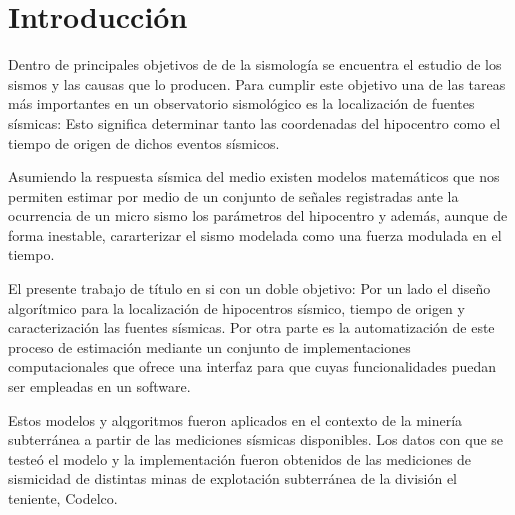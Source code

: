 


\chapter*{Introducción} 

Dentro de principales objetivos de de la sismología se encuentra el estudio
de los sismos y las causas que lo producen. Para cumplir este objetivo una de las
tareas más importantes en un observatorio sismológico es la localización de
fuentes sísmicas: Esto significa determinar tanto las coordenadas del hipocentro
como el tiempo de origen de dichos eventos sísmicos.

Asumiendo la respuesta sísmica del medio existen modelos matemáticos que nos
permiten estimar por medio de un conjunto de señales registradas ante la
ocurrencia de un micro sismo los parámetros del hipocentro y además, aunque de
forma inestable, cararterizar el sismo modelada como una fuerza modulada en el
tiempo. %

El presente trabajo de título en si con un doble objetivo: Por un lado el diseño
algorítmico para la localización de hipocentros sísmico, tiempo de origen y
caracterización las fuentes sísmicas. Por otra parte es la automatización de
este proceso de estimación mediante un conjunto de implementaciones
computacionales que ofrece una interfaz para que cuyas funcionalidades puedan
ser empleadas en un software.

Estos modelos y alqgoritmos fueron aplicados en el contexto de la minería
subterránea a partir de las mediciones sísmicas disponibles. Los datos con que
se testeó el modelo y la implementación fueron obtenidos de las mediciones de
sismicidad de distintas minas de explotación subterránea de la división el
teniente, Codelco.

